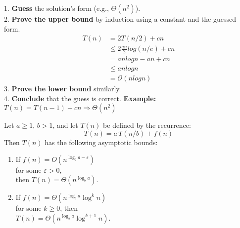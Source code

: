 \documentclass[a4paper,landscape]{article}
\newcommand{\bigo}{\mathcal{O}}
\begin{document}
\begin{multicols}{7}
1. \textbf{Guess} the solution's form (e.g., \( \Theta(n^2) \)).\\
2. \textbf{Prove the upper bound} by induction using a constant and the guessed form.\\
  \begin{equation}
  \begin{split}
    T(n) & = 2T(n/2) + cn \\[-1mm]
    & \leq 2\frac{an}{2}log(n/e)+cn \\[-1mm]
    & = anlogn-an+cn \\[-1mm]
    & \leq anlogn \\[-1mm]
    & = \bigo(nlogn)
  \end{split}
  \end{equation}
3. \textbf{Prove the lower bound} similarly.\\
4. \textbf{Conclude} that the guess is correct.
\textbf{Example:}\\
\( T(n) = T(n - 1) + cn \Rightarrow \Theta(n^2) \)
\endtcolorbox

\tcolorbox[mybox={Master Theorem}]
Let \( a \geq 1 \), \( b > 1 \), and let \( T(n) \) be defined by the recurrence:
\[T(n) = a\,T(n/b) + f(n)\]
Then \( T(n) \) has the following asymptotic bounds:
\begin{enumerate}[noitemsep, topsep=0pt]
    \item If \( f(n) = O(n^{\log_b a - \varepsilon}) \) \\ for some \( \varepsilon > 0 \),\\
          then \( T(n) = \Theta(n^{\log_b a}) \).

    \item If \( f(n) = \Theta(n^{\log_b a} \log^k n) \) \\ for some \( k \geq 0 \),
          then \\ \( T(n)=\Theta(n^{\log_b a}\log^{k+1}n) \).


\end{enumerate}
\end{multicols}
\end{document}
